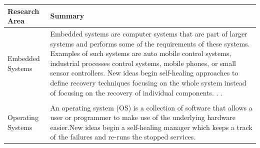 \begin{center}
    \begin{tabular}{ | p{3cm} | p{11cm} |}
    \hline
    Research Area & Summary \\ \hline
    Embedded Systems & Embedded systems are computer systems that are part of larger
systems and performs some of the requirements of these systems. Examples of such systems are auto mobile control systems, industrial processes control systems, mobile phones, or small sensor controllers. 
New ideas begin self-healing approaches to define recovery techniques focusing on the whole system instead of focusing on the recovery of individual components.
\cite{Harald:SelfHealingSurvey:2011}.
\cite{Crnkovic:SelfHealingSurvey:2005}.\\

\\ \hline
    Operating Systems & An operating system (OS) is a collection of software that allows a user or programmer to make use of the underlying hardware easier.New ideas begin a self-healing manager which keeps a track of the failures and re-runs the stopped services.
    

\end{tabular}
\end{center}
